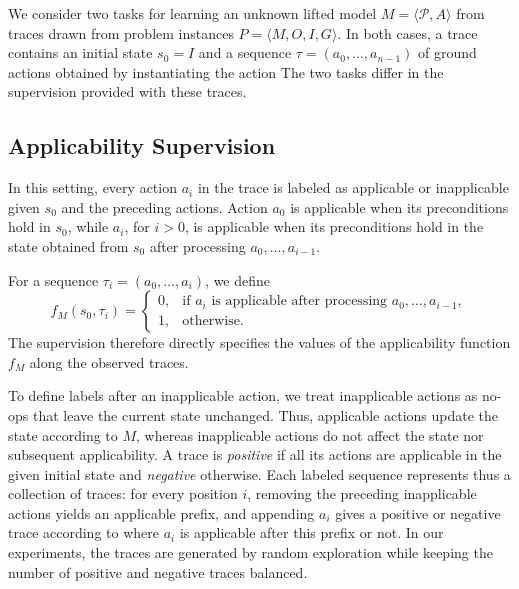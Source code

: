 \label{sec:task}


We consider two tasks for learning an unknown lifted \strips model
$M=\langle\mathcal{P},A\rangle$ from traces drawn from problem instances
$P=\langle M,O,I,G\rangle$. In both cases, a trace contains an initial
state $s_0=I$ and a sequence $\tau=(a_0,\ldots,a_{n-1})$ of ground actions
obtained by instantiating the action 
The two tasks differ in the supervision provided with these traces.

\subsection{Applicability Supervision}

In this setting, every action $a_i$ in the trace is labeled as applicable or
inapplicable given $s_0$ and the preceding actions. Action $a_0$ is applicable
when its preconditions hold in $s_0$, while $a_i$, for $i>0$, is applicable
when its preconditions hold in the state obtained from $s_0$ after processing
$a_0,\ldots,a_{i-1}$.

For a sequence $\tau_i=(a_0,\ldots,a_i)$, we define
$$
f_M(s_0,\tau_i)=
\begin{cases}
0, & \text{if $a_i$ is applicable after processing $a_0,\ldots,a_{i-1}$},\\
1, & \text{otherwise}.
\end{cases}
$$
The supervision therefore directly specifies the values of the applicability function \(f_M\) along the observed traces.

To define labels after an inapplicable action, we treat inapplicable actions as
no-ops that  leave the current state unchanged. Thus, applicable actions
update the state according to $M$, whereas inapplicable actions do not affect
the state nor subsequent applicability. A trace is \emph{positive} if all its actions are applicable in the
given initial state and \emph{negative} otherwise. Each labeled sequence represents thus
a collection of traces: for every position $i$, removing the preceding
inapplicable actions yields an applicable prefix, and appending $a_i$ gives a
positive or negative trace according to where  $a_i$ is applicable after this prefix
or not. In our experiments, the traces are generated by random exploration while keeping
the number of positive and negative traces balanced. 

